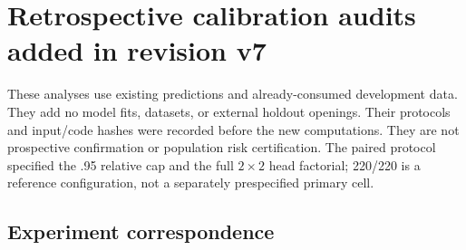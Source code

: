 \FloatBarrier
\section{Retrospective calibration audits added in revision v7}
\label{app:v7}
These analyses use existing predictions and already-consumed development data. They add no model fits, datasets, or external holdout openings. Their protocols and input/code hashes were recorded before the new computations. They are not prospective confirmation or population risk certification. The paired protocol specified the .95 relative cap and the full $2\times2$ head factorial; 220/220 is a reference configuration, not a separately prespecified primary cell.

\subsection{Experiment correspondence}
